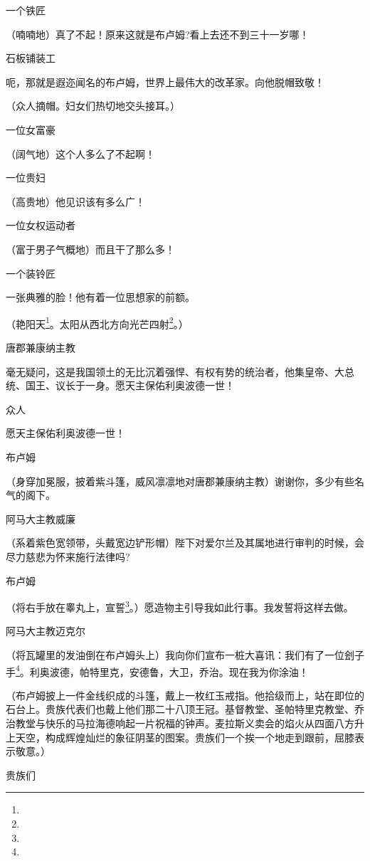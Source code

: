 \par 一个铁匠
\par （喃喃地）真了不起！原来这就是布卢姆?看上去还不到三十一岁哪！
\par 石板铺装工
\par 呃，那就是遐迩闻名的布卢姆，世界上最伟大的改革家。向他脱帽致敬！
\par （众人摘帽。妇女们热切地交头接耳。）
\par 一位女富豪
\par （阔气地）这个人多么了不起啊！
\par 一位贵妇
\par （高贵地）他见识该有多么广！
\par 一位女权运动者
\par （富于男子气概地）而且干了那么多！
\par 一个装铃匠
\par 一张典雅的脸！他有着一位思想家的前额。
\par （艳阳天\footnote{}。太阳从西北方向光芒四射\footnote{}。）
\par 唐郡兼康纳主教
\par 毫无疑问，这是我国领土的无比沉着强悍、有权有势的统治者，他集皇帝、大总统、国王、议长于一身。愿天主保佑利奥波德一世！
\par 众人
\par 愿天主保佑利奥波德一世！
\par 布卢姆
\par （身穿加冕服，披着紫斗篷，威风凛凛地对唐郡兼康纳主教）谢谢你，多少有些名气的阁下。
\par 阿马大主教威廉
\par （系着紫色宽领带，头戴宽边铲形帽）陛下对爱尔兰及其属地进行审判的时候，会尽力慈悲为怀来施行法律吗?
\par 布卢姆
\par （将右手放在睾丸上，宣誓\footnote{}。）愿造物主引导我如此行事。我发誓将这样去做。
\par 阿马大主教迈克尔
\par （将瓦罐里的发油倒在布卢姆头上）我向你们宣布一桩大喜讯：我们有了一位刽子手\footnote{}。利奥波德，帕特里克，安德鲁，大卫，乔治。现在我为你涂油！
\par （布卢姆披上一件金线织成的斗篷，戴上一枚红玉戒指。他拾级而上，站在即位的石台上。贵族代表们也戴上他们那二十八顶王冠。基督教堂、圣帕特里克教堂、乔治教堂与快乐的马拉海德响起一片祝福的钟声。麦拉斯义卖会的焰火从四面八方升上天空，构成辉煌灿烂的象征阴茎的图案。贵族们一个挨一个地走到跟前，屈膝表示敬意。）
\par 贵族们
